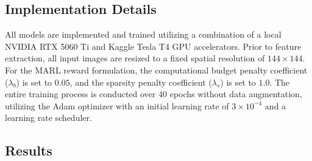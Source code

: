 \subsection{Implementation Details}
All models are implemented and trained utilizing a combination of a local NVIDIA RTX 5060 Ti and Kaggle Tesla T4 GPU accelerators. Prior to feature extraction, all input images are resized to a fixed spatial resolution of $144 \times 144$. For the MARL reward formulation, the computational budget penalty coefficient ($\lambda_b$) is set to $0.05$, and the sparsity penalty coefficient ($\lambda_s$) is set to $1.0$. The entire training process is conducted over $40$ epochs without data augmentation, utilizing the Adam optimizer with an initial learning rate of $3 \times 10^{-4}$ and a learning rate scheduler.
\subsection{Results}
